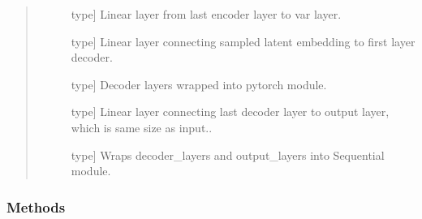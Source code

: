 \documentclass[letterpaper,10pt,english]{sphinxmanual}
\begin{document}
\begin{fulllineitems}
\begin{quote}
\begin{description}
\begin{description}
\item[{}] \leavevmode{[}type{]}
Linear layer from last encoder layer to var layer.

\item[{}] \leavevmode{[}type{]}
Linear layer connecting sampled latent embedding to first layer decoder.

\item[{}] \leavevmode{[}type{]}
Decoder layers wrapped into pytorch module.

\item[{}] \leavevmode{[}type{]}
Linear layer connecting last decoder layer to output layer, which is same size as input..

\item[{}] \leavevmode{[}type{]}
Wraps decoder\_layers and output\_layers into Sequential module.

\item[{}] \leavevmode
\item[{}] \leavevmode
\end{description}

\end{description}\end{quote}
\subsubsection*{Methods}


\begin{savenotes}\sphinxatlongtablestart\begin{longtable}{}
\hline

\endfirsthead

%
{}\\
\hline

\endhead

\hline
{}\\
\endfoot

\endlastfoot


\end{longtable}
\end{savenotes}
\end{fulllineitems}
\end{document}

